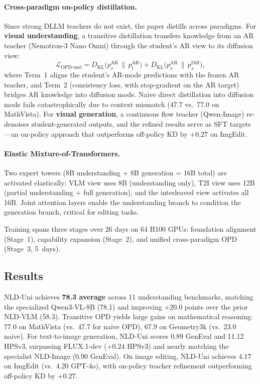 \documentclass[11pt,a4paper]{article}
\begin{document}
\paragraph{Cross-paradigm on-policy distillation.} Since strong DLLM teachers do not exist, the paper distills across paradigms. For \textbf{visual understanding}, a transitive distillation transfers knowledge from an AR teacher (Nemotron-3 Nano Omni) through the student's AR view to its diffusion view:
\begin{equation}
  \mathcal{L}_{\mathrm{OPD\text{-}und}} = D_{\mathrm{KL}}\bigl(p_s^{\mathrm{AR}} \,\|\, p_t^{\mathrm{AR}}\bigr) + D_{\mathrm{KL}}\bigl(p_s^{\mathrm{AR}} \,\|\, p_s^{\mathrm{Diff}}\bigr),
\end{equation}
where Term~1 aligns the student's AR-mode predictions with the frozen AR teacher, and Term~2 (consistency loss, with stop-gradient on the AR target) bridges AR knowledge into diffusion mode. Naive direct distillation into diffusion mode fails catastrophically due to context mismatch (47.7 vs.\ 77.0 on MathVista). For \textbf{visual generation}, a continuous flow teacher (Qwen-Image) re-denoises student-generated outputs, and the refined results serve as SFT targets---an on-policy approach that outperforms off-policy KD by $+0.27$ on ImgEdit.

\paragraph{Elastic Mixture-of-Transformers.} Two expert towers (8B understanding + 8B generation = 16B total) are activated elastically: VLM view uses 8B (understanding only), T2I view uses 12B (partial understanding + full generation), and the interleaved view activates all 16B. Joint attention layers enable the understanding branch to condition the generation branch, critical for editing tasks.

Training spans three stages over 26 days on 64 H100 GPUs: foundation alignment (Stage~1), capability expansion (Stage~2), and unified cross-paradigm OPD (Stage~3, 5~days).

\subsection{Results}
NLD-Uni achieves \textbf{78.3 average} across 11 understanding benchmarks, matching the specialized Qwen3-VL-8B (78.1) and improving $+20.0$ points over the prior NLD-VLM (58.3). Transitive OPD yields large gains on mathematical reasoning: 77.0 on MathVista (vs.\ 47.7 for naive OPD), 67.9 on Geometry3k (vs.\ 23.0 naive). For text-to-image generation, NLD-Uni scores 0.89 GenEval and 11.12 HPSv3, surpassing FLUX.1-dev ($+0.24$ HPSv3) and nearly matching the specialist NLD-Image (0.90 GenEval). On image editing, NLD-Uni achieves 4.17 on ImgEdit (vs.\ 4.20 GPT-4o), with on-policy teacher refinement outperforming off-policy KD by $+0.27$.
\end{document}

